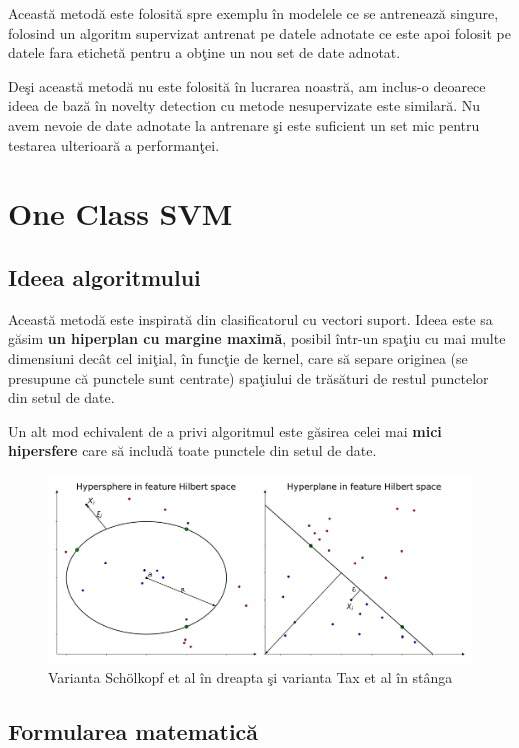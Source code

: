 Această metodă este folosită spre exemplu în modelele ce se antrenează singure, 
folosind un algoritm supervizat antrenat pe datele adnotate ce este apoi 
folosit pe datele fara etichetă pentru a obţine un nou set de date adnotat.

Deşi această metodă nu este folosită în lucrarea noastră, am inclus-o deoarece 
ideea de bază în novelty detection cu metode nesupervizate este similară. Nu avem 
nevoie de date adnotate la antrenare şi este suficient un set mic pentru testarea 
ulterioară a performanţei.

\section{One Class SVM}

\subsection{Ideea algoritmului}

Această metodă este inspirată din clasificatorul cu vectori suport. Ideea este 
sa găsim \textbf{un hiperplan cu margine maximă}, posibil într-un spaţiu cu 
mai multe dimensiuni decât cel iniţial, în funcţie de kernel,
care să separe originea (se presupune că punctele sunt centrate) spaţiului de trăsături
de restul punctelor din setul de date\cite{scholkopf2000support}.

Un alt mod echivalent de a privi algoritmul este găsirea celei mai \textbf{mici 
hipersfere} care să includă toate punctele din setul de date\cite{tax2004support}.

\begin{figure}[H]
    \centering
    \includegraphics[width=\linewidth]{images/Hyperplane-Hypersphere.pdf}
    \caption{Varianta Schölkopf et al în dreapta şi varianta Tax et al în stânga}
\end{figure}

\subsection{Formularea matematică}

